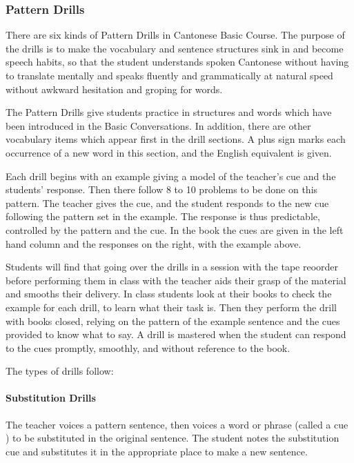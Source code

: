 
\subsubsection{Pattern Drills}

There are six kinds of Pattern Drills in Cantonese Basic Course. The purpose of the drills is to make the vocabulary and sentence structures sink in and become speech habits, so that the student understands spoken Cantonese without having to translate mentally and speaks fluently and grammatically at natural speed without awkward hesitation and groping for words.

The Pattern Drills give students practice in structures and words which have been introduced in the Basic Conversations. In addition, there are other vocabulary items which appear first in the drill sections. A plus sign marks each occurrence of a new word in this section, and the English equivalent is given.

Each drill begins with an example giving a model of the teacher's cue and the students' response. Then there follow 8 to 10 problems to be done on this pattern. The teacher gives the cue, and the student responds to the new cue following the pattern set in the example. The response is thus predictable, controlled by the pattern and the cue. In the book the cues are given in the left hand column and the responses on the right, with the example above.

Students will find that going over the drills in a session with the tape reoorder before performing them in class with the teacher aids their grasp of the material and smooths their delivery. In class students look at their books to check the example for each drill, to learn what their task is. Then they perform the drill with books closed, relying on the pattern of the example sentence and the cues provided to know what to say. A drill is mastered when the student can respond to the cues promptly, smoothly, and without reference to the book.

The types of drills follow:

\paragraph{Substitution Drills}

The teacher voices a pattern sentence, then voices a word or phrase (called a cue ) to be substituted in the original sentence. The student notes the substitution cue and substitutes it in the appropriate place to make a new sentence.

